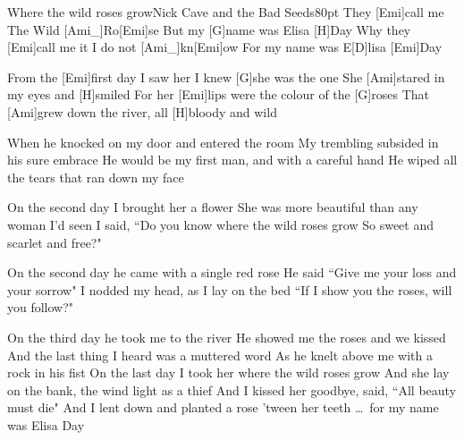 \begin{song}{Where the wild roses grow}{Nick Cave and the Bad Seeds}{80pt}
\chorus%
They [Emi]call me The Wild [Ami_]{Ro}[Emi]se
But my [G]name was Elisa [H]Day
Why they [Emi]call me it I do not [Ami_]{kn}[Emi]ow
For my name was E[D]lisa [Emi]Day

%
From the [Emi]first day I saw her I knew [G]she was the one
She [Ami]stared in my eyes and [H]smiled
For her [Emi]lips were the colour of the [G]roses
That [Ami]grew down the river, all [H]bloody and wild

When he knocked on my door and entered the room
My trembling subsided in his sure embrace
He would be my first man, and with a careful hand
He wiped all the tears that ran down my face
\repchor

%
On the second day I brought her a flower
She was more beautiful than any woman I'd seen
I said, ``Do you know where the wild roses grow
So sweet and scarlet and free?"

On the second day he came with a single red rose
He said ``Give me your loss and your sorrow"
I nodded my head, as I lay on the bed
``If I show you the roses, will you follow?"
\repchor

%
On the third day he took me to the river
He showed me the roses and we kissed
And the last thing I heard was a muttered word
As he knelt above me with a rock in his fist
\vskip20pt
On the last day I took her where the wild roses grow
And she lay on the bank, the wind light as a thief
And I kissed her goodbye, said, ``All beauty must die"
And I lent down and planted a rose 'tween her teeth
\repchor
\dots\ \rl for my name was Elisa Day
\end{song}
